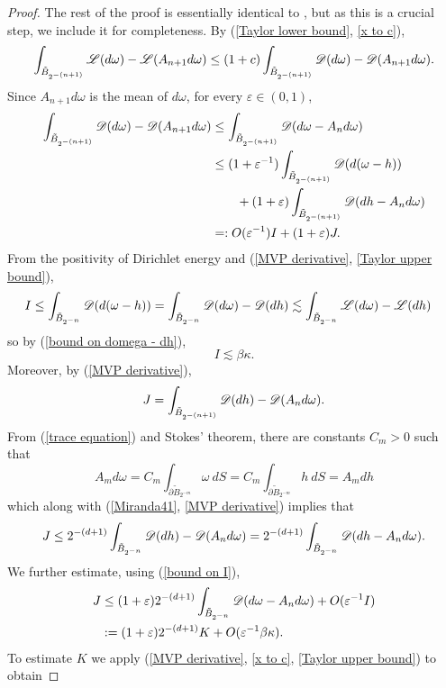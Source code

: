 \begin{proof}
The rest of the proof is essentially identical to \cite[Lemma 4.2]{Miranda66}, but as this is a crucial step, we include it for completeness.
By (\ref{Taylor lower bound}, \ref{x to c}),
$$\int_{\tilde B_{2^{-(n + 1)}}} \mathscr L(d\omega) - \mathscr L(A_{n + 1}d\omega) \leq (1 + c)\int_{\tilde B_{2^{-(n + 1)}}} \mathscr D(d\omega) - \mathscr D(A_{n + 1}d\omega).$$
Since $A_{n + 1}d\omega$ is the mean of $d\omega$, for every $\varepsilon \in (0, 1)$,
\begin{align*}
\int_{\tilde B_{2^{-(n + 1)}}} \mathscr D(d\omega) - \mathscr D(A_{n + 1}d\omega)
&\leq \int_{\tilde B_{2^{-(n + 1)}}} \mathscr D(d\omega - A_nd\omega) \\
&\leq (1 + \varepsilon^{-1}) \int_{\tilde B_{2^{-(n + 1)}}} \mathscr D(d(\omega - h)) \\
&\qquad +(1 + \varepsilon) \int_{\tilde B_{2^{-(n + 1)}}} \mathscr D(dh - A_nd\omega) \\
&=: O(\varepsilon^{-1}) I + (1 + \varepsilon) J.
\end{align*}
From the positivity of Dirichlet energy and (\ref{MVP derivative}, \ref{Taylor upper bound}),
\begin{align*}
I &\leq \int_{\tilde B_{2^{-n}}} \mathscr D(d(\omega - h)) = \int_{\tilde B_{2^{-n}}} \mathscr D(d\omega) - \mathscr D(dh) \lesssim \int_{\tilde B_{2^{-n}}} \mathscr L(d\omega) - \mathscr L(dh)
\end{align*}
so by (\ref{bound on domega - dh}),
\begin{equation}\label{bound on I}
I \lesssim \beta\kappa.
\end{equation}
Moreover, by (\ref{MVP derivative}),
$$J = \int_{\tilde B_{2^{-(n + 1)}}} \mathscr D(dh) - \mathscr D(A_nd\omega).$$
From (\ref{trace equation}) and Stokes' theorem, there are constants $C_m > 0$ such that
$$A_m d\omega = C_m \int_{\partial \tilde B_{2^{-m}}} \omega ~dS = C_m \int_{\partial \tilde B_{2^{-m}}} h ~dS = A_m dh$$
which along with (\ref{Miranda41}, \ref{MVP derivative}) implies that
$$J \leq 2^{-(d + 1)} \int_{\tilde B_{2^{-n}}} \mathscr D(dh) - \mathscr D(A_nd\omega) = 2^{-(d + 1)} \int_{\tilde B_{2^{-n}}} \mathscr D(dh - A_n d\omega).$$
We further estimate, using (\ref{bound on I}),
\begin{align*}
J &\leq (1 + \varepsilon) 2^{-(d + 1)} \int_{\tilde B_{2^{-n}}} \mathscr D(d\omega - A_n d\omega) + O(\varepsilon^{-1} I) \\
&:= (1 + \varepsilon) 2^{-(d + 1)} K + O(\varepsilon^{-1} \beta \kappa).
\end{align*}
To estimate $K$ we apply (\ref{MVP derivative}, \ref{x to c}, \ref{Taylor upper bound}) to obtain

\end{proof}
